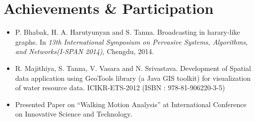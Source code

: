 \documentclass[12pt,a4paper,sans]{moderncv} %
\begin{document}




\section{Achievements \& Participation}
\begin{itemize}
\item P. Bhabak, H. A. Harutyunyan and S. Tanna. Broadcasting in harary-like graphs. In \textit{13th International Symposium on Pervasive Systems, Algorithms, and Networks(I-SPAN 2014)}, Chengdu, 2014. \\
\item 	R. Majithiya, S. Tanna, V. Vasara and N. Srivastava. Development of Spatial data application using GeoTools library (a Java GIS toolkit) for visualization of water resource data. ICIKR-ETS-2012 (ISBN : 978-81-906220-3-5) \\
\item Presented Paper on ``Walking Motion Analysis'' at International Conference on Innovative Science and Technology.

\end{itemize}



\end{document}
